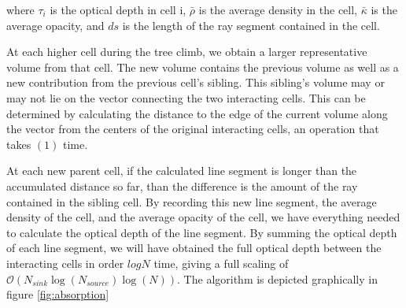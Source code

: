 where $\tau_i$ is the optical depth in cell i, $\bar{\rho}$ is the average density in the cell, $\bar{\kappa}$ is the average opacity, and $ds$ is the length of the ray segment contained in the cell.

At each higher cell during the tree climb, we obtain a larger representative volume from that cell. The new volume contains the previous volume as well as a new contribution from the previous cell's sibling. This sibling's volume may or may not lie on the vector connecting the two interacting cells. This can be determined by calculating the distance to the edge of the current volume along the vector from the centers of the original interacting cells, an operation that takes $\mathcal{(1)}$ time.

At each new parent cell, if the calculated line segment is longer than the accumulated distance so far, than the difference is the amount of the ray contained in the sibling cell. By recording this new line segment, the average density of the cell, and the average opacity of the cell, we have everything needed to calculate the optical depth of the line segment. By summing the optical depth of each line segment, we will have obtained the full optical depth between the interacting cells in order $log{N}$ time, giving a full scaling of $\mathcal{O}(N_{sink}\log(N_{source})\log(N))$. The algorithm is depicted graphically in figure \ref{fig:absorption}


